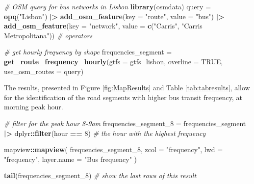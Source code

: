 \documentclass[
]{article}
\newenvironment{Shaded}{\begin{snugshade}}{\end{snugshade}}
\newcommand{\AttributeTok}[1]{\textcolor[rgb]{0.13,0.29,0.53}{#1}}
\newcommand{\CommentTok}[1]{\textcolor[rgb]{0.56,0.35,0.01}{\textit{#1}}}
\newcommand{\ConstantTok}[1]{\textcolor[rgb]{0.56,0.35,0.01}{#1}}
\newcommand{\DecValTok}[1]{\textcolor[rgb]{0.00,0.00,0.81}{#1}}
\newcommand{\FunctionTok}[1]{\textcolor[rgb]{0.13,0.29,0.53}{\textbf{#1}}}
\newcommand{\NormalTok}[1]{#1}
\newcommand{\OtherTok}[1]{\textcolor[rgb]{0.56,0.35,0.01}{#1}}
\newcommand{\SpecialCharTok}[1]{\textcolor[rgb]{0.81,0.36,0.00}{\textbf{#1}}}
\newcommand{\StringTok}[1]{\textcolor[rgb]{0.31,0.60,0.02}{#1}}
\begin{document}
\begin{Shaded}
\begin{Highlighting}[]
\CommentTok{\# OSM query for bus networks in Lisbon}
\FunctionTok{library}\NormalTok{(osmdata)}
\NormalTok{query }\OtherTok{=} \FunctionTok{opq}\NormalTok{(}\StringTok{"Lisbon"}\NormalTok{)  }\SpecialCharTok{|\textgreater{}}
        \FunctionTok{add\_osm\_feature}\NormalTok{(}\AttributeTok{key =} \StringTok{"route"}\NormalTok{,}
                        \AttributeTok{value =} \StringTok{"bus"}\NormalTok{) }\SpecialCharTok{|\textgreater{}}
        \FunctionTok{add\_osm\_feature}\NormalTok{(}\AttributeTok{key =} \StringTok{"network"}\NormalTok{,}
                        \AttributeTok{value =} \FunctionTok{c}\NormalTok{(}\StringTok{"Carris"}\NormalTok{, }\StringTok{"Carris Metropolitana"}\NormalTok{)) }\CommentTok{\# operators}

\CommentTok{\# get hourly frequency by shape}
\NormalTok{frequencies\_segment }\OtherTok{=} \FunctionTok{get\_route\_frequency\_hourly}\NormalTok{(}\AttributeTok{gtfs =}\NormalTok{ gtfs\_lisbon, }
                                                 \AttributeTok{overline =} \ConstantTok{TRUE}\NormalTok{, }
                                                 \AttributeTok{use\_osm\_routes =}\NormalTok{ query)}
\end{Highlighting}
\end{Shaded}

The results, presented in Figure \ref{fig:MapResults} and Table \ref{tab:tabresults}, allow for the identification of the road segments with higher bus transit frequency, at morning peak hour.

\begin{Shaded}
\begin{Highlighting}[]
\CommentTok{\# filter for the peak hour 8{-}9am}
\NormalTok{frequencies\_segment\_8 }\OtherTok{=}\NormalTok{ frequencies\_segment }\SpecialCharTok{|\textgreater{}} 
\NormalTok{  dplyr}\SpecialCharTok{::}\FunctionTok{filter}\NormalTok{(hour }\SpecialCharTok{==} \DecValTok{8}\NormalTok{) }\CommentTok{\# the hour with the highest frequency}

\NormalTok{mapview}\SpecialCharTok{::}\FunctionTok{mapview}\NormalTok{(}
\NormalTok{  frequencies\_segment\_8,}
  \AttributeTok{zcol =} \StringTok{"frequency"}\NormalTok{,}
  \AttributeTok{lwd =} \StringTok{"frequency"}\NormalTok{,}
  \AttributeTok{layer.name =} \StringTok{"Bus frequency"}
\NormalTok{)}

\FunctionTok{tail}\NormalTok{(frequencies\_segment\_8) }\CommentTok{\# show the last rows of this result}
\end{Highlighting}
\end{Shaded}
\end{document}
